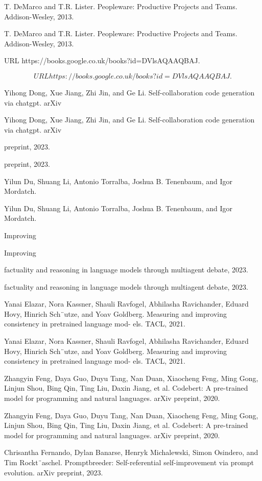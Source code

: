 \documentclass[12pt]{article}
\begin{document}
T. DeMarco and T.R. Lister. Peopleware: Productive Projects and Teams. Addison-Wesley, 2013.


T. DeMarco and T.R. Lister. Peopleware: Productive Projects and Teams. Addison-Wesley, 2013.


URL https://books.google.co.uk/books?id=DVlsAQAAQBAJ.


\begin{equation}
URL https://books.google.co.uk/books?id=DVlsAQAAQBAJ.
\end{equation}


Yihong Dong, Xue Jiang, Zhi Jin, and Ge Li. Self-collaboration code generation via chatgpt. arXiv


Yihong Dong, Xue Jiang, Zhi Jin, and Ge Li. Self-collaboration code generation via chatgpt. arXiv


preprint, 2023.


preprint, 2023.


Yilun Du, Shuang Li, Antonio Torralba, Joshua B. Tenenbaum, and Igor Mordatch.


Yilun Du, Shuang Li, Antonio Torralba, Joshua B. Tenenbaum, and Igor Mordatch.


Improving


Improving


factuality and reasoning in language models through multiagent debate, 2023.


factuality and reasoning in language models through multiagent debate, 2023.


Yanai Elazar, Nora Kassner, Shauli Ravfogel, Abhilasha Ravichander, Eduard Hovy, Hinrich
Sch¨utze, and Yoav Goldberg. Measuring and improving consistency in pretrained language mod-
els. TACL, 2021.


Yanai Elazar, Nora Kassner, Shauli Ravfogel, Abhilasha Ravichander, Eduard Hovy, Hinrich
Sch¨utze, and Yoav Goldberg. Measuring and improving consistency in pretrained language mod-
els. TACL, 2021.


Zhangyin Feng, Daya Guo, Duyu Tang, Nan Duan, Xiaocheng Feng, Ming Gong, Linjun Shou, Bing
Qin, Ting Liu, Daxin Jiang, et al. Codebert: A pre-trained model for programming and natural
languages. arXiv preprint, 2020.


Zhangyin Feng, Daya Guo, Duyu Tang, Nan Duan, Xiaocheng Feng, Ming Gong, Linjun Shou, Bing
Qin, Ting Liu, Daxin Jiang, et al. Codebert: A pre-trained model for programming and natural
languages. arXiv preprint, 2020.


Chrisantha Fernando, Dylan Banarse, Henryk Michalewski, Simon Osindero, and Tim Rockt¨aschel.
Promptbreeder: Self-referential self-improvement via prompt evolution. arXiv preprint, 2023.
\end{document}

